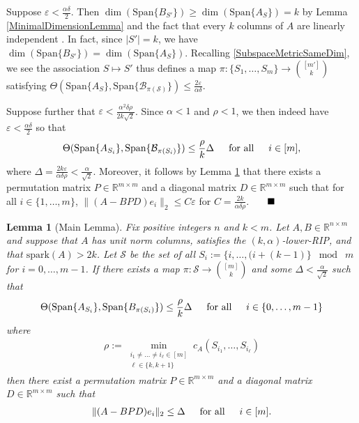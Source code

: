 \documentclass[journal,onecolumn]{IEEEtran}
\newtheorem{lemma}{Lemma}
\begin{document}
Suppose $\varepsilon < \frac{\alpha\delta}{2}$. Then $\dim(\text{Span}\{B_{S'}\}) \geq \dim(\text{Span}\{A_S\}) = k$ by Lemma \ref{MinimalDimensionLemma} and the fact that every $k$ columns of $A$ are linearly independent . In fact, since $|S'| = k$, we have $\dim(\text{Span}\{B_{S'}\}) = \dim(\text{Span}\{A_S\})$. Recalling \eqref{SubspaceMetricSameDim},  we see the association $S \mapsto S'$ thus defines a map $\pi: \{S_1, \ldots, S_m\} \to {[m'] \choose k}$ satisfying $\Theta(\text{Span}\{A_S\}, \text{Span}\{\mathcal{B_{\pi(S)}}\}) \leq \frac{ 2 \varepsilon }{ \alpha \delta }$.

Suppose further that $\varepsilon < \frac{\alpha^2\delta\rho}{2k\sqrt{2}}$. Since $\alpha < 1$ and $\rho < 1$, we then indeed have $\varepsilon < \frac{\alpha\delta}{2}$ so that 
\begin{align}\label{SubspaceDistanceUpperBound}
\Theta(\text{Span}\{A_{S_i}\}, \text{Span}\{\mathcal{B}_{\pi(S_i)}\}) \leq \frac{\rho}{k}\Delta
\indent \text{for all} \indent i \in [m],
\end{align}
%
where $\Delta = \frac{2k\varepsilon}{\alpha\delta\rho} < \frac{\alpha}{\sqrt{2}}$. Moreover, it follows by Lemma \ref{MainLemma} that there exists a permutation matrix $P \in \mathbb{R}^{m \times m}$ and a diagonal matrix $D \in \mathbb{R}^{m \times m}$ such that for all $i \in \{1, \ldots, m\}$,
$\|(A - BPD)e_i\|_2 \leq C\varepsilon$ for $C = \frac{2k}{\alpha\delta\rho}$. $\indent \blacksquare$


\begin{lemma}[Main Lemma]\label{MainLemma}
Fix positive integers $n$ and $k < m$. Let $A, B \in \mathbb{R}^{n \times m}$ and suppose that $A$ has unit norm columns, satisfies the $(k,\alpha)$-lower-RIP, and that $\text{spark}(A) > 2k$. Let $\mathcal{S}$ be the set of all $S_i := \{i, \ldots, (i + (k-1) \} \;\bmod\; m$ for $i = 0, \ldots, m-1$. If there exists a map $\pi: \mathcal{S} \to {[m] \choose k}$ and some $\Delta < \frac{\alpha}{\sqrt{2}}$ such that 
\begin{equation}\label{GapUpperBound}
\Theta(\text{Span}\{A_{S_i}\}, \text{Span}\{B_{\pi(S_i)}\}) \leq \frac{ \rho }{k} \Delta \indent \text{for all} \indent i \in \{0, \ldots, m-1\}
\end{equation}
%
where
\begin{align}\label{rhodef}
\rho := \min_{ \substack{ i_1 \neq \ldots \neq i_{\ell} \in [m] \\ \ell \in \{k, k+1\}}} c_A(S_{i_1}, \ldots, S_{i_{\ell}})
\end{align}
then there exist a permutation matrix $P \in \mathbb{R}^{m \times m}$ and a diagonal matrix $D \in \mathbb{R}^{m \times m}$ such that
\begin{align}
\|(A - BPD)e_i\|_2 \leq \Delta \indent \text{for all} \indent i \in [m].
\end{align}
\end{lemma}
\end{document}
